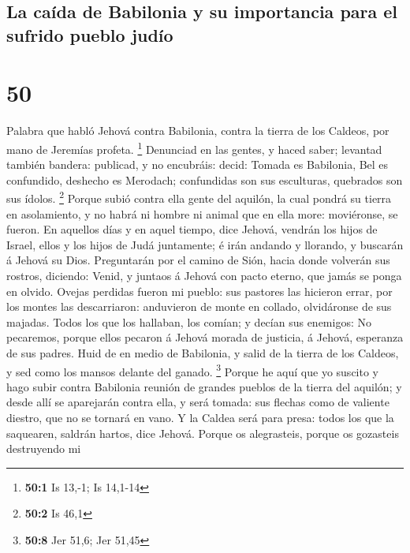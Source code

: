\hypertarget{la-cauxedda-de-babilonia-y-su-importancia-para-el-sufrido-pueblo-juduxedo}{%
\subsection{La caída de Babilonia y su importancia para el sufrido
pueblo
judío}\label{la-cauxedda-de-babilonia-y-su-importancia-para-el-sufrido-pueblo-juduxedo}}

\hypertarget{section-49}{%
\section{50}\label{section-49}}

 Palabra que habló Jehová contra Babilonia, contra la tierra
de los Caldeos, por mano de Jeremías profeta. \footnote{\textbf{50:1} Is
  13,-1; Is 14,1-14}  Denunciad en las gentes, y haced
saber; levantad también bandera: publicad, y no encubráis: decid: Tomada
es Babilonia, Bel es confundido, deshecho es Merodach; confundidas son
sus esculturas, quebrados son sus ídolos. \footnote{\textbf{50:2} Is
  46,1}  Porque subió contra ella gente del aquilón, la cual
pondrá su tierra en asolamiento, y no habrá ni hombre ni animal que en
ella more: moviéronse, se fueron.  En aquellos días y en
aquel tiempo, dice Jehová, vendrán los hijos de Israel, ellos y los
hijos de Judá juntamente; é irán andando y llorando, y buscarán á Jehová
su Dios.  Preguntarán por el camino de Sión, hacia donde
volverán sus rostros, diciendo: Venid, y juntaos á Jehová con pacto
eterno, que jamás se ponga en olvido.  Ovejas perdidas
fueron mi pueblo: sus pastores las hicieron errar, por los montes las
descarriaron: anduvieron de monte en collado, olvidáronse de sus
majadas.  Todos los que los hallaban, los comían; y decían
sus enemigos: No pecaremos, porque ellos pecaron á Jehová morada de
justicia, á Jehová, esperanza de sus padres.  Huid de en
medio de Babilonia, y salid de la tierra de los Caldeos, y sed como los
mansos delante del ganado. \footnote{\textbf{50:8} Jer 51,6; Jer 51,45}
 Porque he aquí que yo suscito y hago subir contra Babilonia
reunión de grandes pueblos de la tierra del aquilón; y desde allí se
aparejarán contra ella, y será tomada: sus flechas como de valiente
diestro, que no se tornará en vano.  Y la Caldea será para
presa: todos los que la saquearen, saldrán hartos, dice Jehová.
 Porque os alegrasteis, porque os gozasteis destruyendo mi

